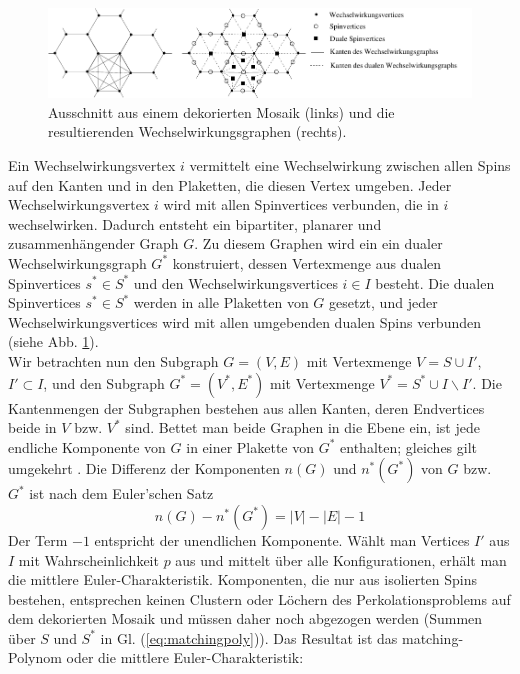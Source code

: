 \begin{figure}[tbp]
  \centering
  \includegraphics{./Euler-figs/interactiongraph}
  \caption{Ausschnitt aus einem dekorierten Mosaik (links) und die resultierenden Wechselwirkungsgraphen (rechts).}
  \label{fig:interactiongraph}
\end{figure}
Ein Wechselwirkungsvertex $i$ vermittelt eine Wechselwirkung zwischen allen Spins auf den Kanten und in den Plaketten, die diesen Vertex umgeben. Jeder Wechselwirkungsvertex $i$ wird mit allen Spinvertices verbunden, die in $i$ wechselwirken. Dadurch entsteht ein bipartiter, planarer und zusammenh\"angender Graph $G$. Zu diesem Graphen wird ein ein dualer Wechselwirkungsgraph $G^*$ konstruiert, dessen Vertexmenge aus dualen Spinvertices $s^* \in S^*$ und den Wechselwirkungsvertices $i\in I$ besteht. Die dualen Spinvertices $s^* \in S^*$ werden in alle Plaketten von $G$ gesetzt, und jeder Wechselwirkungsvertices wird mit allen umgebenden dualen Spins verbunden (siehe Abb. \ref{fig:interactiongraph}).
\\Wir betrachten nun den Subgraph $G=(V,E)$ mit Vertexmenge $V=S\cup I'$, $I'\subset I$, und den Subgraph $G^*=(V^*,E^*)$ mit Vertexmenge $V^*=S^*\cup I\backslash I'$. Die Kantenmengen der Subgraphen bestehen aus allen Kanten, deren Endvertices beide in $V$ bzw. $V^*$ sind. Bettet man beide Graphen in die Ebene ein, ist jede endliche Komponente von $G$ in einer Plakette von $G^*$ enthalten; gleiches gilt umgekehrt \cite{Essam:79}. Die Differenz der Komponenten $n(G)$ und $n^*(G^*)$ von $G$ bzw. $G^*$ ist nach dem Euler'schen Satz 
\begin{equation}
  n(G)-n^*(G^*)=|V|-|E|-1
\end{equation}
Der Term $-1$ entspricht der unendlichen Komponente. W\"ahlt man Vertices $I'$ aus $I$ mit Wahrscheinlichkeit $p$ aus und mittelt \"uber alle Konfigurationen, erh\"alt man die mittlere Euler-Charakteristik. Komponenten, die nur aus isolierten Spins bestehen, entsprechen keinen Clustern oder L\"ochern des Perkolationsproblems auf dem dekorierten Mosaik und m\"ussen daher noch abgezogen werden (Summen \"uber $S$ und $S^*$ in Gl. (\ref{eq:matchingpoly})). Das Resultat ist das matching-Polynom \cite{Essam:79} oder die mittlere Euler-Charakteristik:
